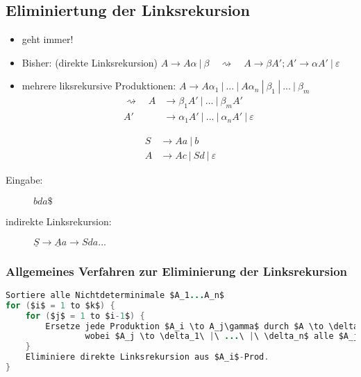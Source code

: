 \subsection{Eliminiertung der Linksrekursion}
\begin{itemize}
 \item geht immer!
 \item Bisher: (direkte Linksrekursion) $A \to A \alpha\ |\ \beta \quad \rightsquigarrow \quad A \to \beta A'; A' \to \alpha A'\ |\ \varepsilon$
 \item mehrere liksrekursive Produktionen: $A \to A\alpha_1\ |\ ...\ |\ A\alpha_n\ |\ \beta_1\ |\ ...\ |\ \beta_m$
         \begin{align*}
          \rightsquigarrow \quad   A &\to \beta_1A'\ |\ ...\ |\ \beta_mA' \\
                              A' &\to \alpha_1A'\ |\ ...\ |\ \alpha_nA'\ |\ \varepsilon
         \end{align*}
\end{itemize}
\Bsp
\begin{align*}
 S &\to Aa\ |\ b \\
 A &\to Ac\ |\ Sd\ |\ \varepsilon
\end{align*}
\begin{description}
 \item[Eingabe:] $bda\$$
 \item[indirekte Linksrekursion:] $\underline{S} \to \underline{A}a \to Sda...$
     \begin{center}
     \end{center}
\end{description}

\subsubsection{Allgemeines Verfahren zur Eliminierung der Linksrekursion}
\begin{lstlisting}[language=Java,mathescape=true,morekeywords={to}]
Sortiere alle Nichtdeterminimale $A_1...A_n$
for ($i$ = 1 to $k$) {
    for ($j$ = 1 to $i-1$) {
        Ersetze jede Produktion $A_i \to A_j\gamma$ durch $A \to \delta_1\gamma\ |\ ...\ |\ \delta_n\gamma$,
                wobei $A_j \to \delta_1\ |\ ...\ |\ \delta_n$ alle $A_j$-Produktionen sind
    }
    Eliminiere direkte Linksrekursion aus $A_i$-Prod.
}
\end{lstlisting}

